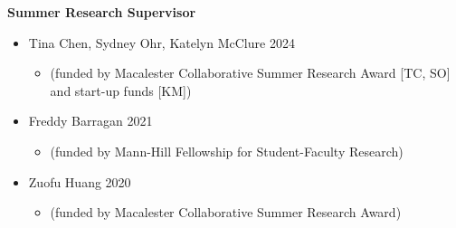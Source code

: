 \documentclass[margin]{res}
\begin{document}
\begin{resume}


\textbf{Summer Research Supervisor}
\begin{itemize}
\item Tina Chen, Sydney Ohr, Katelyn McClure \hfill 2024 
	\begin{itemize} \vspace{-0.2cm}
	\item[] 
	\begin{footnotesize}(funded by Macalester Collaborative Summer Research Award [TC, SO] \\and start-up funds [KM]) \end{footnotesize}
	\end{itemize} \vspace{-0.1cm}
\item Freddy Barragan \hfill 2021 
	\begin{itemize} \vspace{-0.2cm}
	\item[] 
	\begin{footnotesize}(funded by Mann-Hill Fellowship for Student-Faculty Research) \end{footnotesize}
	\end{itemize} \vspace{-0.1cm}
\item Zuofu Huang \hfill 2020 
	\begin{itemize} \vspace{-0.2cm}
	\item[] 
	\begin{footnotesize}(funded by Macalester Collaborative Summer Research Award)\end{footnotesize} \vspace{-0.1cm}\\
	\end{itemize}
\end{itemize}


\end{resume}
\end{document}
